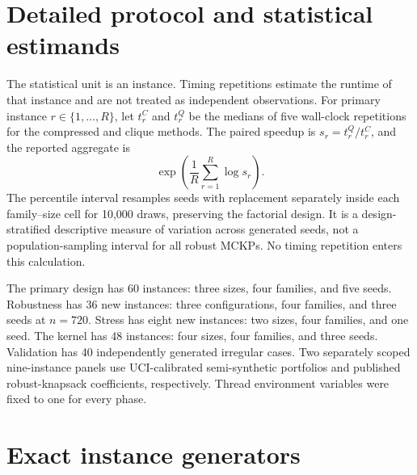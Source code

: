 \documentclass[11pt]{article}
\theoremstyle{plain}
\theoremstyle{definition}
\theoremstyle{remark}
\begin{document}
\section{Detailed protocol and statistical estimands}\label{app:protocol}

The statistical unit is an instance.  Timing repetitions estimate the runtime of that instance and are not treated as independent observations.  For primary instance $r\in\{1,\ldots,R\}$, let $t_r^C$ and $t_r^Q$ be the medians of five wall-clock repetitions for the compressed and clique methods.  The paired speedup is $s_r=t_r^Q/t_r^C$, and the reported aggregate is
\[
\exp\left(\frac1R\sum_{r=1}^R\log s_r\right).
\]
The percentile interval resamples seeds with replacement separately inside each family--size cell for 10,000 draws, preserving the factorial design.  It is a design-stratified descriptive measure of variation across generated seeds, not a population-sampling interval for all robust MCKPs.  No timing repetition enters this calculation.

The primary design has 60 instances: three sizes, four families, and five seeds.  Robustness has 36 new instances: three configurations, four families, and three seeds at $n=720$.  Stress has eight new instances: two sizes, four families, and one seed.  The kernel has 48 instances: four sizes, four families, and three seeds.  Validation has 40 independently generated irregular cases.  Two separately scoped nine-instance panels use UCI-calibrated semi-synthetic portfolios and published robust-knapsack coefficients, respectively.  Thread environment variables were fixed to one for every phase.

\section{Exact instance generators}\label{app:generators}
\end{document}
